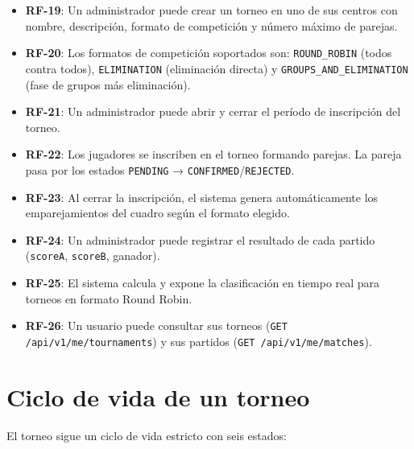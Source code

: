 \begin{itemize}
  \item \textbf{RF-19}: Un administrador puede crear un torneo en uno de sus
    centros con nombre, descripción, formato de competición y número máximo de
    parejas.
  \item \textbf{RF-20}: Los formatos de competición soportados son:
    \texttt{ROUND\_ROBIN} (todos contra todos), \texttt{ELIMINATION} (eliminación
    directa) y \texttt{GROUPS\_AND\_ELIMINATION} (fase de grupos más eliminación).
  \item \textbf{RF-21}: Un administrador puede abrir y cerrar el período de
    inscripción del torneo.
  \item \textbf{RF-22}: Los jugadores se inscriben en el torneo formando parejas.
    La pareja pasa por los estados \texttt{PENDING} → \texttt{CONFIRMED}/\texttt{REJECTED}.
  \item \textbf{RF-23}: Al cerrar la inscripción, el sistema genera automáticamente
    los emparejamientos del cuadro según el formato elegido.
  \item \textbf{RF-24}: Un administrador puede registrar el resultado de cada
    partido (\texttt{scoreA}, \texttt{scoreB}, ganador).
  \item \textbf{RF-25}: El sistema calcula y expone la clasificación en tiempo
    real para torneos en formato Round Robin.
  \item \textbf{RF-26}: Un usuario puede consultar sus torneos
    (\texttt{GET /api/v1/me/tournaments}) y sus partidos
    (\texttt{GET /api/v1/me/matches}).
\end{itemize}

\section{Ciclo de vida de un torneo}
\label{sec:ciclo_torneo}

El torneo sigue un ciclo de vida estricto con seis estados:

